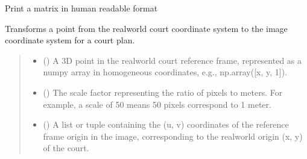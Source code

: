 \documentclass[letterpaper,10pt,english]{sphinxmanual}
\begin{document}

\begin{fulllineitems}
\label{\detokenize{CameraUtils:CameraUtils.PrintMtx}}
\pysigstartsignatures
{}
\pysigstopsignatures
\sphinxAtStartPar
Print a matrix in human readable format

\end{fulllineitems}


\begin{fulllineitems}
\label{\detokenize{CameraUtils:CameraUtils.RW2courtIMG}}
\pysigstartsignatures
{}
\pysigstopsignatures
\sphinxAtStartPar
Transforms a point from the real\sphinxhyphen{}world court coordinate system to the image coordinate system
for a court plan.
\begin{quote}\begin{description}
\begin{itemize}
\item {} 
\sphinxAtStartPar
{} () \textendash{} A 3D point in the real\sphinxhyphen{}world court reference frame, represented as a numpy array
in homogeneous coordinates, e.g., np.array({[}x, y, 1{]}).

\item {} 
\sphinxAtStartPar
{} () \textendash{} The scale factor representing the ratio of pixels to meters.
For example, a scale of 50 means 50 pixels correspond to 1 meter.

\item {} 
\sphinxAtStartPar
{} () \textendash{} A list or tuple containing the (u, v) coordinates of the reference frame origin in the image,
corresponding to the real\sphinxhyphen{}world origin (x, y) of the court.


\end{itemize}
\end{description}
\end{quote}
\end{fulllineitems}
\end{document}
